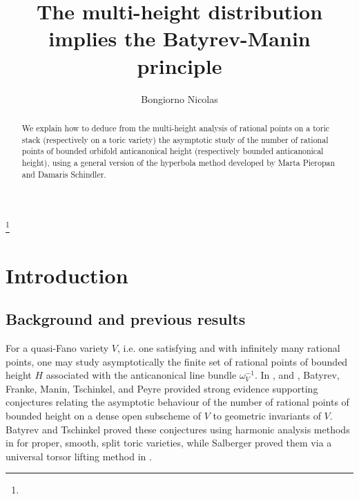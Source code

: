 \documentclass{proc-l}
\newcommand{\Z}{\mathbf{Z}}
\newcommand{\Q}{\mathbf{Q}}
\newcommand{\w}{\omega}
\theoremstyle{definition}
\theoremstyle{remark}
\numberwithin{equation}{section}
\begin{document}
\title{The multi-height distribution implies the Batyrev-Manin principle}


\author{Bongiorno Nicolas}
\address{}
\curraddr{}
\thanks{}



\subjclass[2020]{}

\date{}

\dedicatory{}


\begin{abstract}
We explain how to deduce from the multi-height analysis of rational points on a toric stack (respectively on a toric variety) the asymptotic study of the number of rational points of bounded orbifold anticanonical height (respectively bounded anticanonical height), using a general version of the hyperbola method developed by Marta Pieropan and Damaris Schindler.
\end{abstract}


\maketitle





\section{Introduction}

\subsection{Background and previous results}

For a quasi-Fano variety $V$, i.e. one satisfying \cite[Hypothesis 3.27]{Peyre_beyond_height} and with infinitely many rational points, one may study asymptotically the finite set of rational points of bounded height $H$ associated with the anticanonical line bundle $\w_{V}^{-1}$. In \cite{FrankeManinTschinkel1989}, \cite{Batyrev1990} and \cite{peyre_duke}, Batyrev, Franke, Manin, Tschinkel, and Peyre provided strong evidence supporting conjectures relating the asymptotic behaviour of the number of rational points of bounded height on a dense open subscheme of $V$ to geometric invariants of $V$. Batyrev and Tschinkel proved these conjectures using harmonic analysis methods in \cite{batyrev_toric_varieties} for proper, smooth, split toric varieties, while Salberger proved them via a universal torsor lifting method in \cite{salberger_torsor}.
\end{document}

